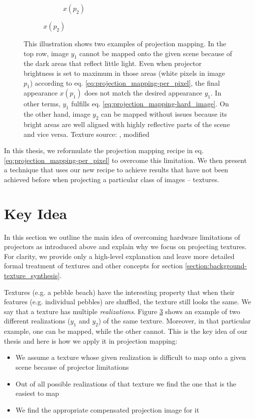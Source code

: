 \begin{figure}[ht]
\begin{subfigure}{\textwidth}
\begin{subfigure}{0.2\textwidth}
            \caption*{\(x(p_2)\)}
            \label{fig:intro_pixels_vs_stats-stats_proj}
        \end{subfigure}
    \end{subfigure}
    \caption{This illustration shows two examples of projection mapping. In the top row, image \(y_1\) cannot be mapped onto the given scene because of the dark areas that reflect little light. Even when projector brightness is set to maximum in those areas (white pixels in image \(p_1\)) according to eq. \ref{eq:projection_mapping-per_pixel}, the final appearance \(x(p_1)\) does not match the desired appearance \(y_1\). In other terms, \(y_1\) fulfills eq. \ref{eq:projection_mapping-hard_image}. On the other hand, image \(y_2\) can be mapped without issues because its bright areas are well aligned with highly reflective parts of the scene and vice versa. Texture source: \citet{Gatys2015}, modified}
    \label{fig:intro_pixels_vs_stats}
\end{figure}

In this thesis, we reformulate the projection mapping recipe in eq. \ref{eq:projection_mapping-per_pixel} to overcome this limitation. We then present a technique that uses our new recipe to achieve results that have not been achieved before when projecting a particular class of images -- textures.

\section{Key Idea}
\label{section:intro-key_idea}

In this section we outline the main idea of overcoming hardware limitations of projectors as introduced above and explain why we focus on projecting textures. For clarity, we provide only a high-level explanation and leave more detailed formal treatment of textures and other concepts for section \ref{section:background-texture_synthesis}.

Textures (e.g. a pebble beach) have the interesting property that when their features (e.g. individual pebbles) are shuffled, the texture still looks the same. We say that a texture has multiple \textit{realizations}. Figure \ref{fig:intro_pixels_vs_stats} shows an example of two different realizations (\(y_1\) and \(y_2\)) of the same texture. Moreover, in that particular example, one can be mapped, while the other cannot. This is the key idea of our thesis and here is how we apply it in projection mapping:

\begin{itemize}
    \item We assume a texture whose given realization is difficult to map onto a given scene because of projector limitations
    \item Out of all possible realizations of that texture we find the one that is the easiest to map
    \item We find the appropriate compensated projection image for it
\end{itemize}


